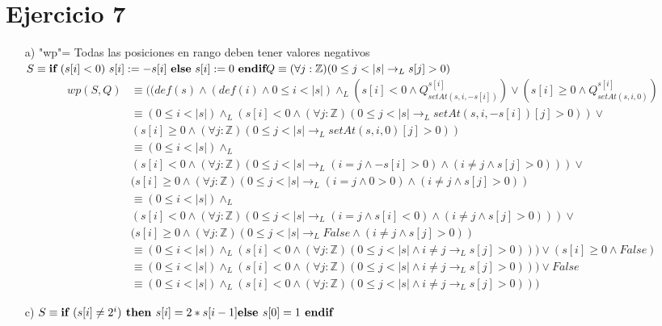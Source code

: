 \documentclass{article}
\begin{document}
{\section*{Ejercicio 7}
\normalsize{\begin{itemize}
    \item [a) ] "wp"= Todas las posiciones en rango deben tener valores negativos\\
    \setcounter{equation}{0}
    $S\equiv\textbf{if}\ (s[i]<0)\ s[i]:=-s[i]\ \textbf{else}\ s[i]:=0\ \textbf{endif}\\
    Q\equiv (\forall j:\mathbb{Z})(0\leq j<|s| \to_L s[j]>0)$
    \begin{align}
        wp(S,Q)&\equiv((def(s)\land(def(i)\land 0\leq i<|s|)\land_L (s[i]<0 \land Q^{s[i]}_{setAt(s,i,-s[i])})\lor(s[i]\geq0 \land Q^{s[i]}_{setAt(s,i,0)})\\
        &\equiv(0\leq i<|s|)\land_L (s[i]<0 \land (\forall j:\mathbb{Z})(0\leq j<|s| \to_L setAt(s,i,-s[i])[j]>0))\lor\\\nonumber
        &(s[i]\geq0 \land (\forall j:\mathbb{Z})(0\leq j<|s| \to_L setAt(s,i,0)[j]>0))\\
        &\equiv(0\leq i<|s|)\land_L\\\nonumber 
        &(s[i]<0 \land (\forall j:\mathbb{Z})(0\leq j<|s| \to_L (i=j \land -s[i]>0)\land(i\neq j \land s[j]>0)))\lor\\\nonumber
        &(s[i]\geq0 \land (\forall j:\mathbb{Z})(0\leq j<|s| \to_L (i=j \land 0>0)\land(i\neq j \land s[j]>0))\\
        &\equiv(0\leq i<|s|)\land_L\\\nonumber 
        &(s[i]<0 \land (\forall j:\mathbb{Z})(0\leq j<|s| \to_L (i=j \land s[i]<0)\land(i\neq j \land s[j]>0)))\lor\\\nonumber
        &(s[i]\geq0 \land (\forall j:\mathbb{Z})(0\leq j<|s| \to_L \textit{False}\land(i\neq j \land s[j]>0))\\
        &\equiv(0\leq i<|s|)\land_L (s[i]<0 \land (\forall j:\mathbb{Z})(0\leq j<|s| \land i\neq j \to_L s[j]>0)))\lor (s[i]\geq0 \land \textit{False})\\
        &\equiv(0\leq i<|s|)\land_L (s[i]<0 \land (\forall j:\mathbb{Z})(0\leq j<|s| \land i\neq j \to_L s[j]>0)))\lor \textit{False}\\
        &\equiv(0\leq i<|s|)\land_L (s[i]<0 \land (\forall j:\mathbb{Z})(0\leq j<|s| \land i\neq j \to_L s[j]>0)))
    \end{align}
    \item [c) ] $S\equiv \textbf{if }(s[i]\neq 2^{i})\textbf{ then } \\s[i]=2*s[i-1]\\ \textbf{else }\\s[0]=1\\ \textbf{ endif}$\\

\end{itemize}}}
\end{document}

